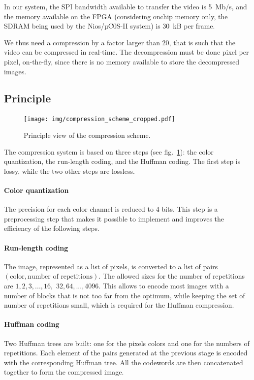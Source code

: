\documentclass[english, DIV=13]{scrartcl}
\begin{document}
In our system, the SPI bandwidth available to transfer the video is \SI{5}{Mb/s},
and the memory available on the FPGA (considering onchip memory only, the SDRAM
being used by the Nios/µC0S-II system) is \SI{30}{kB} per frame.

We thus need a compression by a factor larger than 20, that is such that
the video can be compressed in real-time. The decompression must be done
pixel per pixel, on-the-fly, since there is no memory available to store the
decompressed images.

\subsection{Principle}

\begin{figure}
    \centering
    \texttt{[image: img/compression\_scheme\_cropped.pdf]}
    \caption{Principle view of the compression scheme.}
    \label{fig:compression}
\end{figure}

The compression system is based on three steps (see fig.~\ref{fig:compression}):
the color quantization, the run-length coding, and the Huffman coding. The first
step is lossy, while the two other steps are lossless.

\paragraph{Color quantization} The precision for each color channel is
reduced to 4 bits. This step is a preprocessing step that makes it possible
to implement and improves the efficiency of the following steps.

\paragraph{Run-length coding} The image, represented as a list of pixels,
is converted to a list of pairs $(\text{color}, \text{number of repetitions})$.
The allowed sizes for the number of repetitions are
$1, 2, 3, ..., 16,$ $32, 64, ..., 4096$. This allows to encode most images with
a number of blocks that is not too far from the optimum, while keeping the set
of number of repetitions small, which is required for the Huffman compression.

\paragraph{Huffman coding} Two Huffman trees are built: one for the pixels colors
and one for the numbers of repetitions. Each element of the pairs generated
at the previous stage is encoded with the corresponding Huffman tree.
All the codewords are then concatenated together to form the compressed image.
\end{document}
